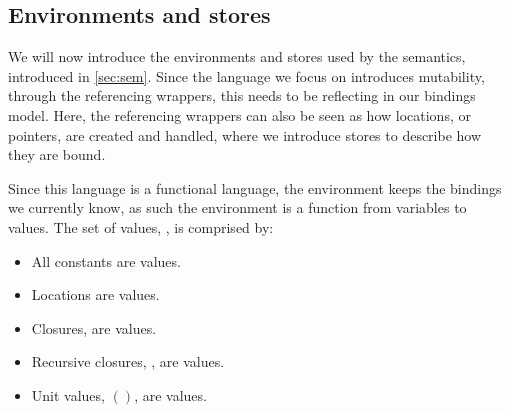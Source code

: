 \documentclass[../../master.tex]{subfiles}
\begin{document}
\iffalse
\begin{definition}[Bound variables]\label{def:bv}
	The set of bound variables is given by:
	\begin{align*}
		bv(x^p)&=\emptyset\\
		bv(c^p)&=\emptyset\\
		bv([\lambda\;y.e_1^{p'}]^p)&=bv(e_1^{p'})\cup\{y\}\\
		bv([e_1^{p'}\;e_2^{p''}]^p)&=bv(e_1^{p'})\cup bv(e_2^{p''})\\
		bv([\mbox{let}\;y\;e_1^{p'}\;e_2^{p''}]^p)&=bv(e_1^{p'})\cup bv(e_2^{p''})\cup\{y\}\\
		bv([\mbox{let rec}\;f\;e_1^{p'}\;e_2^{p''}]^p)&=bv(e_1^{p'})\cup bv(e_2^{p''})\cup\{f\}\\
		bv([\mbox{case}\;e^{p'}\;\pi^{p''}]^p)&=bv(e_1^{p'})\cup bv(\pi)\\
		bv([(s\;e^{p'})\;\pi])&=bv(e^{p'})\cup bv(\pi)\cup\tau(s)\\
		bv([(s\;e^{p'})])&=bv(e^{p'})\cup\tau(s)\\
		bv([\mbox{ref}\;e^{p'}]^p)&=bv(e^{p'})\\
		bv([!e^{p'}]^p)&=bv(e^{p'})\\
		bv([e_1^{p'}\;:=\;e_2^{p''}]^p)&=bv(e_1^{p'})\cup bv(e_2^{p''})\\
	\end{align*}
\end{definition}
\fi

\subsection{Environments and stores}\label{sec:EnvSto}
We will now introduce the environments and stores used by the semantics, introduced in \cref{sec:sem}.
Since the language we focus on introduces mutability, through the referencing wrappers, this needs to be reflecting in our bindings model.
Here, the referencing wrappers can also be seen as how locations, or pointers, are created and handled, where we introduce stores to describe how they are bound.

Since this language is a functional language, the environment keeps the bindings we currently know, as such the environment is a function from variables to values.
The set of values, , is comprised by:
\begin{itemize}
	\item All constants are values.
	\item Locations are values.
	\item Closures,  are values.
	\item Recursive closures, , are values.
	\item Unit values, $()$, are values.
\end{itemize}
\end{document}
